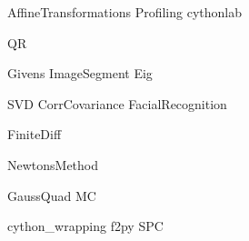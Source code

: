 \documentclass[nociteref]{SIAM-GH-book}
\begin{document}
{AffineTransformations}
{Profiling}
{cythonlab}

{QR}


{Givens}
{ImageSegment}
{Eig}


{SVD}
{CorrCovariance}
{FacialRecognition}

{FiniteDiff}

{NewtonsMethod}


{GaussQuad}
{MC}

{cython_wrapping}
{f2py}
{SPC}
\end{document}
